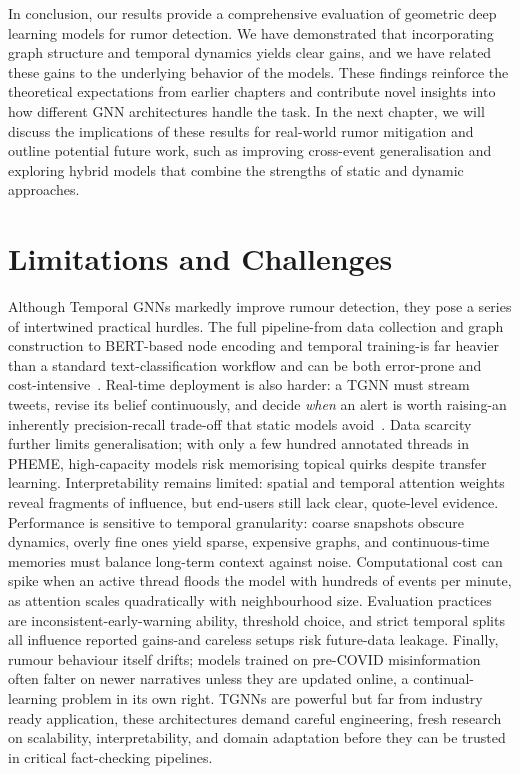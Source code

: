 \documentclass{cshonours}
\begin{document}
In conclusion, our results provide a comprehensive evaluation of geometric deep learning models for rumor detection. We have demonstrated that incorporating graph structure and temporal dynamics yields clear gains, and we have related these gains to the underlying behavior of the models. These findings reinforce the theoretical expectations from earlier chapters and contribute novel insights into how different GNN architectures handle the task. In the next chapter, we will discuss the implications of these results for real-world rumor mitigation and outline potential future work, such as improving cross-event generalisation and exploring hybrid models that combine the strengths of static and dynamic approaches.





\chapter{Limitations and Challenges}


Although Temporal GNNs markedly improve rumour detection, they pose a series of intertwined practical hurdles. The full pipeline-from data collection and graph construction to BERT-based node encoding and temporal training-is far heavier than a standard text-classification workflow and can be both error-prone and cost-intensive~\cite{Li2023Zebra}. Real-time deployment is also harder: a TGNN must stream tweets, revise its belief continuously, and decide \emph{when} an alert is worth raising-an inherently precision-recall trade-off that static models avoid~\cite{Wang2025Challenging}. Data scarcity further limits generalisation; with only a few hundred annotated threads in PHEME, high-capacity models risk memorising topical quirks despite transfer learning. Interpretability remains limited: spatial and temporal attention weights reveal fragments of influence, but end-users still lack clear, quote-level evidence. Performance is sensitive to temporal granularity: coarse snapshots obscure dynamics, overly fine ones yield sparse, expensive graphs, and continuous-time memories must balance long-term context against noise. Computational cost can spike when an active thread floods the model with hundreds of events per minute, as attention scales quadratically with neighbourhood size. Evaluation practices are inconsistent-early-warning ability, threshold choice, and strict temporal splits all influence reported gains-and careless setups risk future-data leakage. Finally, rumour behaviour itself drifts; models trained on pre-COVID misinformation often falter on newer narratives unless they are updated online, a continual-learning problem in its own right. TGNNs are powerful but far from industry ready application, these architectures demand careful engineering, fresh research on scalability, interpretability, and domain adaptation before they can be trusted in critical fact-checking pipelines.
\end{document}
